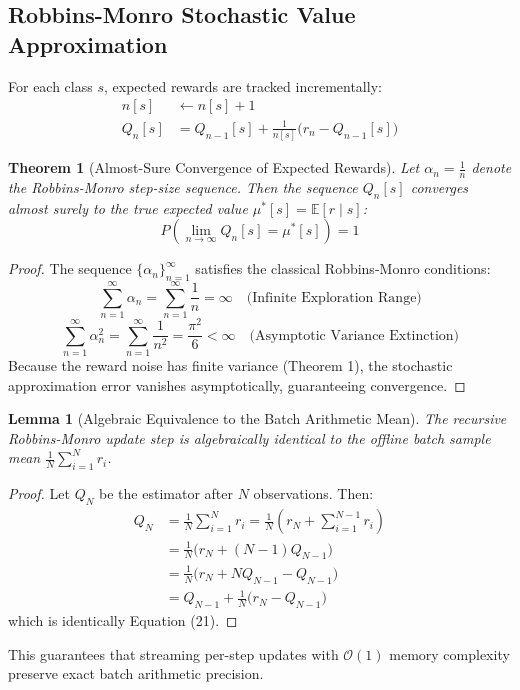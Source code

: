 \documentclass[10pt,journal,compsoc]{IEEEtran}
\newtheorem{theorem}{Theorem}
\newtheorem{lemma}{Lemma}
\begin{document}
\subsection{Robbins-Monro Stochastic Value Approximation}
For each class $s$, expected rewards are tracked incrementally:
\begin{align}
n[s] &\leftarrow n[s] + 1 \\
Q_n[s] &= Q_{n-1}[s] + \frac{1}{n[s]} \Big(r_n - Q_{n-1}[s]\Big)
\end{align}

\begin{theorem}[Almost-Sure Convergence of Expected Rewards]
Let $\alpha_n = \frac{1}{n}$ denote the Robbins-Monro step-size sequence. Then the sequence $Q_n[s]$ converges almost surely to the true expected value $\mu^*[s] = \mathbb{E}[r \mid s]$:
\begin{equation}
P\left( \lim_{n \to \infty} Q_n[s] = \mu^*[s] \right) = 1
\end{equation}
\end{theorem}
\begin{proof}
The sequence $\{\alpha_n\}_{n=1}^\infty$ satisfies the classical Robbins-Monro conditions:
\begin{equation}
\sum_{n=1}^\infty \alpha_n = \sum_{n=1}^\infty \frac{1}{n} = \infty \quad \text{(Infinite Exploration Range)}
\end{equation}
\begin{equation}
\sum_{n=1}^\infty \alpha_n^2 = \sum_{n=1}^\infty \frac{1}{n^2} = \frac{\pi^2}{6} < \infty \quad \text{(Asymptotic Variance Extinction)}
\end{equation}
Because the reward noise has finite variance (Theorem 1), the stochastic approximation error vanishes asymptotically, guaranteeing convergence.
\end{proof}

\begin{lemma}[Algebraic Equivalence to the Batch Arithmetic Mean]
The recursive Robbins-Monro update step is algebraically identical to the offline batch sample mean $\frac{1}{N}\sum_{i=1}^N r_i$.
\end{lemma}
\begin{proof}
Let $Q_N$ be the estimator after $N$ observations. Then:
\begin{align}
Q_N &= \frac{1}{N} \sum_{i=1}^N r_i = \frac{1}{N} \left( r_N + \sum_{i=1}^{N-1} r_i \right) \nonumber \\
&= \frac{1}{N} \Big( r_N + (N-1) Q_{N-1} \Big) \nonumber \\
&= \frac{1}{N} \Big( r_N + N Q_{N-1} - Q_{N-1} \Big) \nonumber \\
&= Q_{N-1} + \frac{1}{N} \Big( r_N - Q_{N-1} \Big)
\end{align}
which is identically Equation (21).
\end{proof}
This guarantees that streaming per-step updates with $\mathcal{O}(1)$ memory complexity preserve exact batch arithmetic precision.
\end{document}
